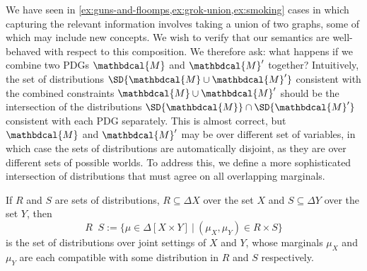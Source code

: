 \documentclass{article}
\theoremstyle{plain}
\theoremstyle{definition}
\theoremstyle{remark}
\newcommand{\notation}[2][]{#1}
\renewcommand{\notation}[2][]{{\color{notationcolor} #2}}
\DeclareMathOperator\dcap{\mathop{\dot\cap}}
\newcommand{\dg}[1]{\mathbdcal{#1}}
\numberwithin{equation}{section}
\begin{document}
\begin{vfull}
We have seen
	in \cref{ex:guns-and-floomps,ex:grok-union,ex:smoking} cases in
	which capturing the relevant information involves taking a
	union of two graphs, some of which may include new
	concepts. We wish to verify that our semantics are
	well-behaved with respect to this composition.	  
We therefore ask: what happens if we combine two PDGs $\dg M$
	and $\dg M'$ together? Intuitively, the set of distributions
	$\SD{\dg M \cup \dg M'}$ consistent with the combined
	constraints $\dg M\cup \dg M'$ should be the intersection of the
	distributions $\SD{\dg M} \cap \SD{\dg M'}$ consistent
	with each PDG separately. This is almost correct, but $\dg M$
	and $\dg M'$ may be over different set of variables, in which
	case the sets of distributions are automatically disjoint, as
	they are over different sets of possible worlds. To address
	this, we define a more sophisticated intersection of
	distributions that must agree on all overlapping
	marginals. %

\begin{defn}[$\dcap$]\label{def:marginal-dist-intersection}
	If $R$ and $S$ are sets of distributions, $R \subseteq \Delta X$ over the set $X$ and $S\subseteq \Delta Y$ over the set $Y$, then
		{$$R \dcap S := \Big\{ \mu \in  \Delta [X \!\times\! Y] ~\Big|~ (\mu_{X}, \mu_{Y}) \in R \times S \Big\}  $$}%
	is the set of distributions over joint settings of $X$ and $Y$, whose marginals $\mu_X$ and $\mu_Y$ are each compatible with some distribution in $R$ and $S$ respectively. 
	

\end{defn}
\end{vfull}
\end{document}
